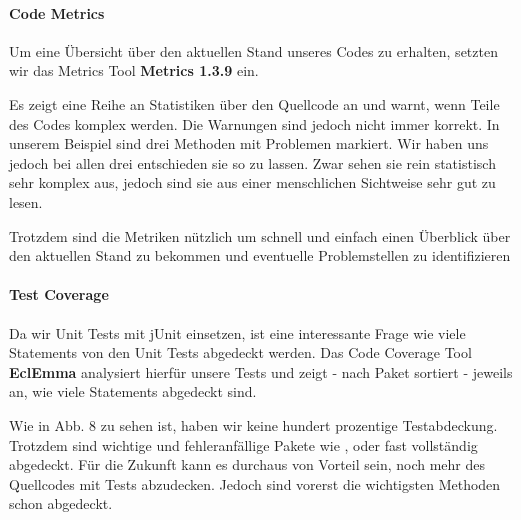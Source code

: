 \paragraph{Code Metrics}

Um eine Übersicht über den aktuellen Stand unseres Codes zu erhalten, setzten wir das Metrics Tool \textbf{Metrics 1.3.9} ein. 


Es zeigt eine Reihe an Statistiken über den Quellcode an und warnt, wenn Teile des Codes komplex werden. 
Die Warnungen sind jedoch nicht immer korrekt. In unserem Beispiel sind drei Methoden mit Problemen markiert. Wir haben uns jedoch bei allen drei entschieden sie so zu lassen. Zwar sehen sie rein statistisch sehr komplex aus, jedoch sind sie aus einer menschlichen Sichtweise sehr gut zu lesen.

Trotzdem sind die Metriken nützlich um schnell und einfach einen Überblick über den aktuellen Stand zu bekommen und eventuelle Problemstellen zu identifizieren

\paragraph{Test Coverage}

Da wir Unit Tests mit jUnit einsetzen, ist eine interessante Frage wie viele Statements von den Unit Tests abgedeckt werden.
Das Code Coverage Tool \textbf{EclEmma} analysiert hierfür unsere Tests und zeigt - nach Paket sortiert - jeweils an, wie viele Statements abgedeckt sind.


Wie in Abb. 8 zu sehen ist, haben wir keine hundert prozentige Testabdeckung. Trotzdem sind wichtige und fehleranfällige Pakete wie ,  oder  fast vollständig abgedeckt.
Für die Zukunft kann es durchaus von Vorteil sein, noch mehr des Quellcodes mit Tests abzudecken. Jedoch sind vorerst die wichtigsten Methoden schon abgedeckt.